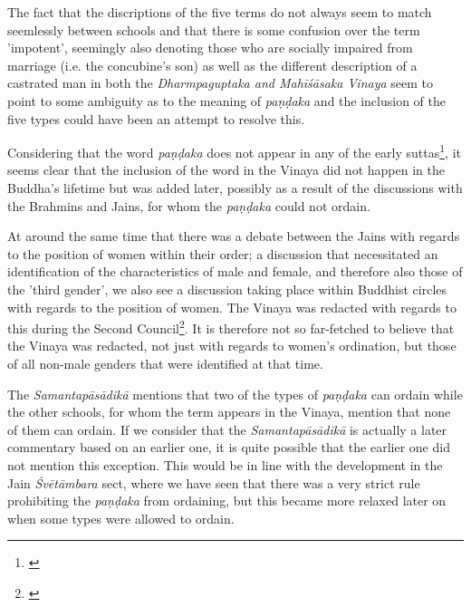 The fact that the discriptions of the five terms do not always seem to match seemlessly between schools and that there is some confusion over the term 'impotent', seemingly also denoting those who are socially impaired from marriage (i.e. the concubine's son) as well as the different description of a castrated man in both the {\em Dharmpaguptaka and Mahīśāsaka Vinaya} seem to point to some ambiguity as to the meaning of {\em paṇḍaka} and the inclusion of the five types could have been an attempt to resolve this.

Considering that the word {\em paṇḍaka} does not appear in any of the early suttas\footnote{\cite{vimala}}, it seems clear that the inclusion of the word in the Vinaya did not happen in the Buddha's lifetime but was added later, possibly as a result of the discussions with the Brahmins and Jains, for whom the {\em paṇḍaka} could not ordain.

At around the same time that there was a debate between the Jains with regards to the position of women within their order; a discussion that necessitated an identification of the characteristics of male and female, and therefore also those of the 'third gender', we also see a discussion taking place within Buddhist circles with regards to the position of women. The Vinaya was redacted with regards to this during the Second Council\footnote{\cite{sujato2009}}. It is therefore not so far-fetched to believe that the Vinaya was redacted, not just with regards to women's ordination, but those of all non-male genders that were identified at that time.

The {\em Samantapāsādikā} mentions that two of the types of {\em paṇḍaka} can ordain while the other schools, for whom the term appears in the Vinaya, mention that none of them can ordain. If we consider that the {\em Samantapāsādikā} is actually a later commentary based on an earlier one, it is quite possible that the earlier one did not mention this exception. This would be in line with the development in the Jain {\em Śvētāmbara} sect, where we have seen that there was a very strict rule prohibiting the {\em paṇḍaka} from ordaining, but this became more relaxed later on when some types were allowed to ordain.



